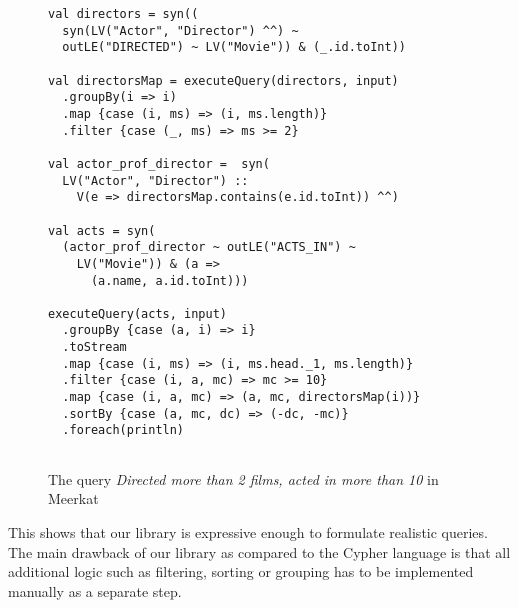 \begin{figure}[h]
\begin{lstlisting}
val directors = syn((
  syn(LV("Actor", "Director") ^^) ~ 
  outLE("DIRECTED") ~ LV("Movie")) & (_.id.toInt))
 
val directorsMap = executeQuery(directors, input)
  .groupBy(i => i)
  .map {case (i, ms) => (i, ms.length)}
  .filter {case (_, ms) => ms >= 2}
 
val actor_prof_director =  syn(
  LV("Actor", "Director") ::
    V(e => directorsMap.contains(e.id.toInt)) ^^)
 
val acts = syn(
  (actor_prof_director ~ outLE("ACTS_IN") ~ 
    LV("Movie")) & (a => 
      (a.name, a.id.toInt)))
 
executeQuery(acts, input)
  .groupBy {case (a, i) => i} 
  .toStream
  .map {case (i, ms) => (i, ms.head._1, ms.length)} 
  .filter {case (i, a, mc) => mc >= 10}
  .map {case (i, a, mc) => (a, mc, directorsMap(i))}
  .sortBy {case (a, mc, dc) => (-dc, -mc)}
  .foreach(println)
    
\end{lstlisting}
\caption{The query \emph{Directed more than 2 films, acted in more than 10} in Meerkat}
\label{fig:helpers}
\end{figure}


This shows that our library is expressive enough to formulate realistic queries.
The main drawback of our library as compared to the Cypher language is that all additional logic such as
filtering, sorting or grouping has to be implemented manually as a separate step.

